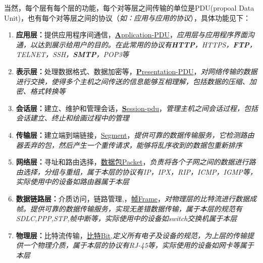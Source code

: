 \documentclass[UTF8,a4paper,12pt]{ctexbook}
\begin{document}
			当然，每个层有每个层的功能，每个对等层之间传输的单位是PDU(propoal  Data Unit)，也有每个对等层之间的协议（\textit{如：应用与应用的协议}），具体功能见下：
			\begin{enumerate}
				\item \textbf{应用层：}提供应用程序间通信，\underline{\textbf{A}pplication-PDU}，\textit{应用层与应用程序界面沟通，以达到展示给用户的目的。在此常用的协议有\textbf{HTTP}，HTTPS，\textbf{FTP}，TELNET，SSH，\textbf{SMTP}，POP3等}
				\item \textbf{表示层：}处理数据格式、数据加密等，\underline{\textbf{P}resentation-PDU}，\textit{对网络传输的数据进行交换，使得多个主机之间传送的信息能够互相理解，包括数据的压缩、加密、格式转换等}
				\item \textbf{会话层：}建立、维护和管理会话，\underline{\textbf{S}ession-pdu}，\textit{管理主机之间会话过程，包括会话建立、终止和绘画过程中的管理}
				\item \textbf{传输层：}建立端到端链接，\underline{Segment}，\textit{提供可靠的数据传输服务，它检测路由器丢弃的包，然后产生一个重传请求，能够将乱序收到的数据包重新排序}
				\item \textbf{网络层：}寻址和路由选择，\underline{数据包Packet}，\textit{负责将各个子网之间的数据进行路由选择，分组与重组，属于本层的协议有IP，IPX，RIP，ICMP，IGMP等，实际使用中的设备如路由器属于本层}
				\item \textbf{数据链路层：}介质访问，链路管理,，\underline{帧Frame}，\textit{对物理层的比特流进行数据成帧。提供可靠的数据传输服务，实现无差错数据传输，属于本层的规范有SDLC,PPP,STP,帧中断等，实际使用中的设备如switch交换机属于本层}
				\item \textbf{物理层：}比特流传输，\underline{比特Bit},\textit{定义所有电子及设备的规范，为上层的传输提供一个物理介质，属于本层的协议有RJ-45等，实际使用的设备如网卡等属于本层}
			\end{enumerate}	
			
\end{document}
